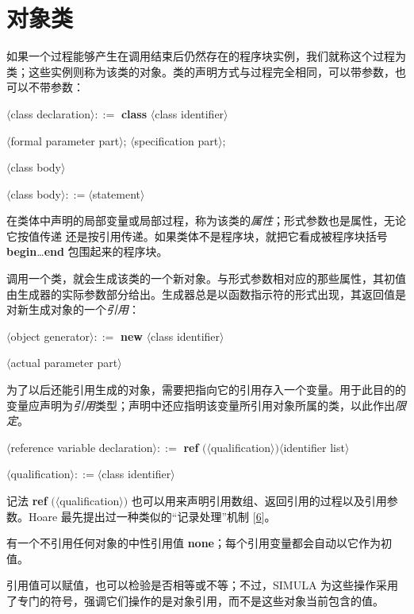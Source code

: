 \section[对象类]{对象类}

如果一个过程能够产生在调用结束后仍然存在的程序块实例，我们就称这个过程为类；这些实例则称为该类的对象。类的声明方式与过程完全相同，可以带参数，也可以不带参数：

\quad $\langle$class declaration$\rangle ::=$ \textbf{class} $\langle$class identifier$\rangle$

\tabto*{11.6em}$\langle$formal parameter part$\rangle$; $\langle$specification part$\rangle$;

\tabto*{11.6em}$\langle$class body$\rangle$

\quad $\langle$class body$\rangle ::= \langle$statement$\rangle$

在类体中声明的局部变量或局部过程，称为该类的\textit{属性}；形式参数也是属性，无论它按值传递
还是按引用传递。如果类体不是程序块，就把它看成被程序块括号 \textbf{begin}\dots\textbf{end} 包围起来的程序块。

调用一个类，就会生成该类的一个新对象。与形式参数相对应的那些属性，其初值由生成器的实际参数部分给出。生成器总是以函数指示符的形式出现，其返回值是对新生成对象的一个\textit{引用}：

\quad $\langle$object generator$\rangle ::=$ \textbf{new} $\langle$class identifier$\rangle$

\tabto*{11.6em}$\langle$actual parameter part$\rangle$

为了以后还能引用生成的对象，需要把指向它的引用存入一个变量。用于此目的的变量应声明为\textit{引用}类型；声明中还应指明该变量所引用对象所属的类，以此作出\textit{限定}。

\quad $\langle$reference variable declaration$\rangle ::=$ \textbf{ref} $(\langle $qualification$\rangle) \langle$identifier list$\rangle$

\quad $\langle$qualification$\rangle ::= \langle$class identifier$\rangle$

\noindent
记法 \textbf{ref} $(\langle$qualification$\rangle)$ 也可以用来声明引用数组、返回引用的过程以及引用参数。Hoare 最先提出过一种类似的“记录处理”机制 [\hyperref[ref:6]{6}]。

有一个不引用任何对象的中性引用值 \textbf{none}；每个引用变量都会自动以它作为初值。

引用值可以赋值，也可以检验是否相等或不等；不过，SIMULA 为这些操作采用了专门的符号，强调它们操作的是对象引用，而不是这些对象当前包含的值。

